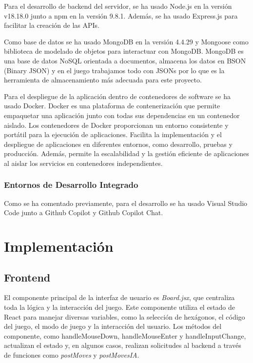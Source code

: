 \documentclass[12pt,epsf,titlepage,a4paper]{article}
\begin{document}
Para el desarrollo de backend del servidor, se ha usado Node.js en la versión v18.18.0 junto a npm en la versión 9.8.1. Además, se ha usado Express.js para facilitar la creación de las APIs.

Como base de datos se ha usado MongoDB en la versión 4.4.29 y Mongoose como biblioteca de modelado de objetos para interactuar con MongoDB. MongoDB es una base de datos NoSQL orientada a documentos, almacena los datos en BSON (Binary JSON) y en el juego trabajamos todo con JSONs por lo que es la herramienta de almacenamiento más adecuada para este proyecto. 

Para el despliegue de la aplicación dentro de contenedores de software se ha usado Docker. Docker es una plataforma de contenerización que permite empaquetar una aplicación junto con todas sus dependencias en un contenedor aislado. Los contenedores de Docker proporcionan un entorno consistente y portátil para la ejecución de aplicaciones. Facilita la implementación y el despliegue de aplicaciones en diferentes entornos, como desarrollo, pruebas y producción. Además,  permite la escalabilidad y la gestión eficiente de aplicaciones al aislar los servicios en contenedores independientes.

\subsubsection{Entornos de Desarrollo Integrado}
Como se ha comentado previamente, para el desarrollo se ha usado Visual Studio Code \cite {vscode} junto a Github Copilot \cite{vscopilot} y Github Copilot Chat.

\section{Implementación}

\subsection{Frontend}
El componente principal de la interfaz de usuario es \emph{Board.jsx}, que centraliza toda la lógica y la interacción del juego. Este componente utiliza el estado de React para manejar diversas variables, como la selección de hexágonos, el código del juego, el modo de juego y la interacción del usuario. Los métodos del componente, como handleMouseDown, handleMouseEnter y handleInputChange, actualizan el estado y, en algunos casos, realizan solicitudes al backend a través de funciones como \emph{postMoves} y \emph{postMovesIA}.
\end{document}
